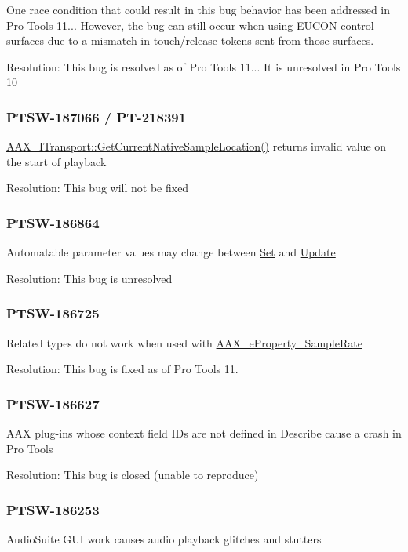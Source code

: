 One race condition that could result in this bug behavior has been addressed in Pro Tools 11... However, the bug can still occur when using E\+U\+C\+ON control surfaces due to a mismatch in touch/release tokens sent from those surfaces.

Resolution\+: This bug is resolved as of Pro Tools 11... It is unresolved in Pro Tools 10\hypertarget{a00846_PTSW-187066}{}\subsubsection{P\+T\+S\+W-\/187066 / P\+T-\/218391}\label{a00846_PTSW-187066}
\mbox{\hyperlink{a01885_a8119233b03774528ffaa519771d792a0}{A\+A\+X\+\_\+\+I\+Transport\+::\+Get\+Current\+Native\+Sample\+Location()}} returns invalid value on the start of playback

Resolution\+: This bug will not be fixed\hypertarget{a00846_PTSW-186864}{}\subsubsection{P\+T\+S\+W-\/186864}\label{a00846_PTSW-186864}
Automatable parameter values may change between \mbox{\hyperlink{a01537_a4dd6d99de8dc4440bac3ae4eefa19f94}{Set}} and \mbox{\hyperlink{a01669_a685858711efb8634ce66c327f2865c71}{Update}}

Resolution\+: This bug is unresolved\hypertarget{a00846_PTSW-186725}{}\subsubsection{P\+T\+S\+W-\/186725}\label{a00846_PTSW-186725}
Related types do not work when used with \mbox{\hyperlink{a00662_a13e384f22825afd3db6d68395b79ce0dac5294e2feb18587d57b6ca0216a6bb1e}{A\+A\+X\+\_\+e\+Property\+\_\+\+Sample\+Rate}}

Resolution\+: This bug is fixed as of Pro Tools 11.\hypertarget{a00846_PTSW-186627}{}\subsubsection{P\+T\+S\+W-\/186627}\label{a00846_PTSW-186627}
A\+AX plug-\/ins whose context field I\+Ds are not defined in Describe cause a crash in Pro Tools

Resolution\+: This bug is closed (unable to reproduce)\hypertarget{a00846_PTSW-186253}{}\subsubsection{P\+T\+S\+W-\/186253}\label{a00846_PTSW-186253}
Audio\+Suite G\+UI work causes audio playback glitches and stutters

